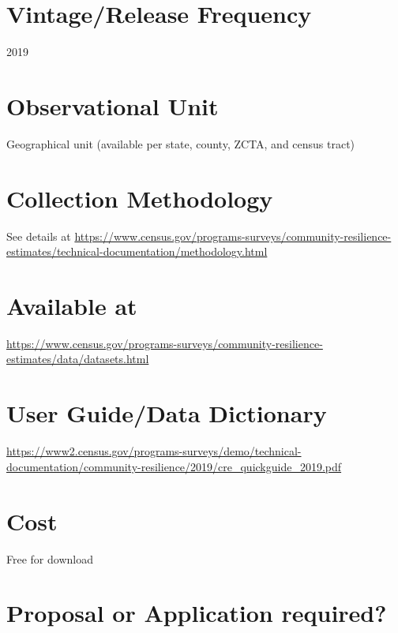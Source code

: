 \documentclass[
]{book}
\begin{document}
\hypertarget{vintagerelease-frequency-18}{%
\section{Vintage/Release Frequency}\label{vintagerelease-frequency-18}}

2019

\hypertarget{observational-unit-18}{%
\section{Observational Unit}\label{observational-unit-18}}

Geographical unit (available per state, county, ZCTA, and census tract)

\hypertarget{collection-methodology-18}{%
\section{Collection Methodology}\label{collection-methodology-18}}

See details at \url{https://www.census.gov/programs-surveys/community-resilience-estimates/technical-documentation/methodology.html}

\hypertarget{available-at-18}{%
\section{Available at}\label{available-at-18}}

\url{https://www.census.gov/programs-surveys/community-resilience-estimates/data/datasets.html}

\hypertarget{user-guidedata-dictionary-18}{%
\section{User Guide/Data Dictionary}\label{user-guidedata-dictionary-18}}

\url{https://www2.census.gov/programs-surveys/demo/technical-documentation/community-resilience/2019/cre_quickguide_2019.pdf}

\hypertarget{cost-18}{%
\section{Cost}\label{cost-18}}

Free for download

\hypertarget{proposal-or-application-required-18}{%
\section{Proposal or Application required?}\label{proposal-or-application-required-18}}
\end{document}
